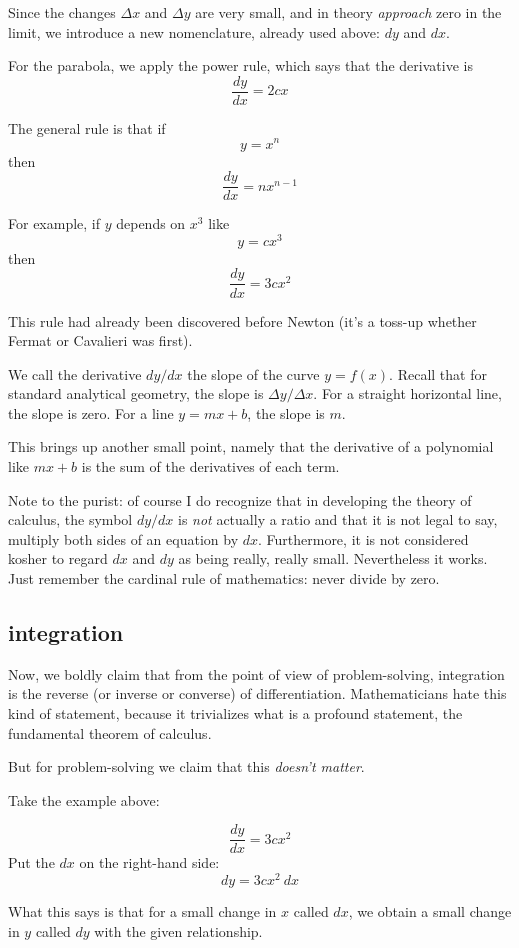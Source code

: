 \documentclass[11pt, oneside]{article}
\begin{document}
Since the changes $\Delta x$ and $\Delta y$ are very small, and in theory \emph{approach} zero in the limit, we introduce a new nomenclature, already used above:  $dy$ and $dx$.

For the parabola, we apply the power rule, which says that the derivative is
\[ \frac{dy}{dx} = 2cx \]

The general rule is that if
\[ y = x^n \]
then
\[ \frac{dy}{dx} = n x^{n-1} \]

For example, if $y$ depends on $x^3$ like
\[ y = cx^3 \]
then
\[ \frac{dy}{dx} = 3cx^2 \]

This rule had already been discovered before Newton (it's a toss-up whether Fermat or Cavalieri was first).

We call the derivative $dy/dx$ the slope of the curve $y = f(x)$.  Recall that for standard analytical geometry, the slope is $\Delta y/\Delta x$.  For a straight horizontal line, the slope is zero.  For a line $y = mx + b$, the slope is $m$.

This brings up another small point, namely that the derivative of a polynomial like $mx + b$ is the sum of the derivatives of each term.

Note to the purist:  of course I do recognize that in developing the theory of calculus, the symbol $dy/dx$ is \emph{not} actually a ratio and that it is not legal to say, multiply both sides of an equation by $dx$.  Furthermore, it is not considered kosher to regard $dx$ and $dy$ as being really, really small.  Nevertheless it works.  Just remember the cardinal rule of mathematics:  never divide by zero.

\subsection*{integration}

Now, we boldly claim that from the point of view of problem-solving, integration is the reverse (or inverse or converse) of differentiation.  Mathematicians hate this kind of statement, because it trivializes what is a profound statement, the fundamental theorem of calculus.  

But for problem-solving we claim that this \emph{doesn't matter}.

Take the example above:

 \[ \frac{dy}{dx} = 3cx^2 \]
Put the $dx$ on the right-hand side:
\[ dy = 3cx^2 \ dx \]

What this says is that for a small change in $x$ called $dx$, we obtain a small change in $y$ called $dy$ with the given relationship.
\end{document}
